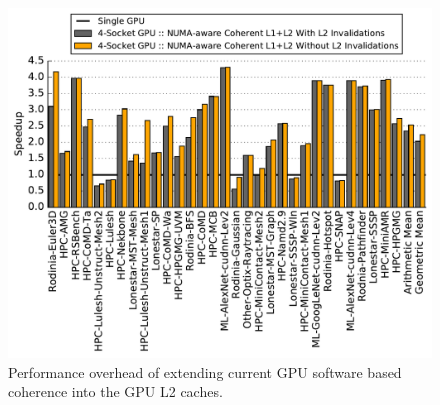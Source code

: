 \begin{figure}[t]
    \centering
    \includegraphics[width=1.0\columnwidth]{figures/plot_no_inval_WB.pdf}
    \caption{Performance overhead of extending current GPU software based coherence
    into the GPU L2 caches.}
    \label{fig:invalidations}
\end{figure}
